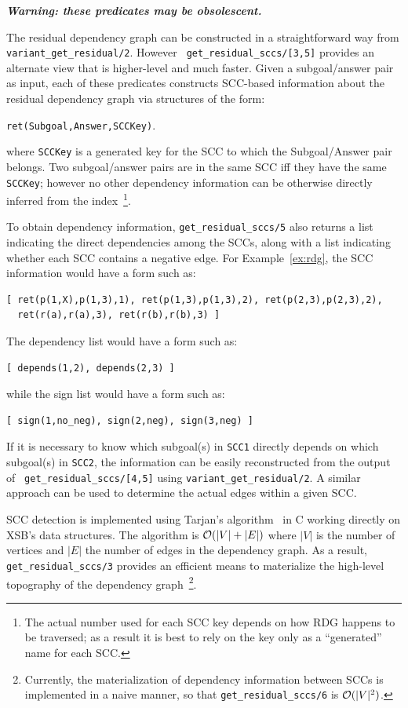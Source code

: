 \begin{description}
%
{\bf {\em Warning: these predicates may be obsolescent.}}

The residual dependency graph can be constructed in a straightforward
way from {\tt variant\_get\_residual/2}.  However {\tt
  get\_residual\_sccs/[3,5]} provides an alternate view that is
higher-level and much faster.  Given a subgoal/answer pair as
input, each of these predicates constructs SCC-based information about
the residual dependency graph via structures of the form:
%
\begin{center}
{\tt ret(Subgoal,Answer,SCCKey)}.
\end{center}
%
where {\tt SCCKey} is a generated key for the SCC to which the
Subgoal/Answer pair belongs. Two subgoal/answer pairs are in the same
SCC iff they have the same {\tt SCCKey}; however no other dependency
information can be otherwise directly inferred from the
index~\footnote{The actual number used for each SCC key depends on how
  RDG happens to be traversed; as a result it is best to rely on the
  key only as a ``generated'' name for each SCC.}.

To obtain dependency information, {\tt get\_residual\_sccs/5} also
returns a list indicating the direct dependencies among the SCCs,
along with a list indicating whether each SCC contains a negative
edge.  For Example~\ref{ex:rdg}, the SCC information would have a form
such as:
\begin{verbatim}
[ ret(p(1,X),p(1,3),1), ret(p(1,3),p(1,3),2), ret(p(2,3),p(2,3),2),
  ret(r(a),r(a),3), ret(r(b),r(b),3) ]
\end{verbatim}
%
The dependency list would have a form such as:
\begin{verbatim}
[ depends(1,2), depends(2,3) ]
\end{verbatim}
while the sign list would have a form such as:
\begin{verbatim}
[ sign(1,no_neg), sign(2,neg), sign(3,neg) ]
\end{verbatim}
If it is necessary to know which subgoal(s) in {\tt SCC1} directly
depends on which subgoal(s) in {\tt SCC2}, the information can be
easily reconstructed from the output of {\tt
  get\_residual\_sccs/[4,5]} using {\tt variant\_get\_residual/2}.  A
similar approach can be used to determine the actual edges within a
given SCC.

SCC detection is implemented using Tarjan's algorithm~\cite{Tarj72} in
C working directly on XSB's data structures.  The algorithm is
${\cal O}(|V| + |E|)$ where $|V|$ is the number of vertices and $|E|$ the
number of edges in the dependency graph.  As a result, {\tt
  get\_residual\_sccs/3} provides an efficient means to materialize
the high-level topography of the dependency graph~\footnote{Currently,
  the materialization of dependency information between SCCs is
  implemented in a naive manner, so that {\tt get\_residual\_sccs/6}
  is ${\cal O}(|V|^2)$.}.


\end{description}
